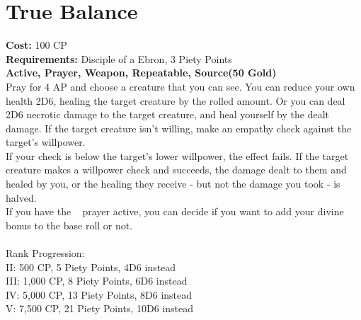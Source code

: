 \section{True Balance}\label{prayer:trueBalance}
\textbf{Cost:} 100 CP\\
\textbf{Requirements:} Disciple of a Ebron, 3 Piety Points \\
\textbf{Active, Prayer, Weapon, Repeatable, Source(50 Gold)}\\
Pray for 4 AP and choose a creature that you can see.
You can reduce your own health 2D6, healing the target creature by the rolled amount.
Or you can deal 2D6 necrotic damage to the target creature, and heal yourself by the dealt damage.
If the target creature isn't willing, make an empathy check against the target's willpower.\\
If your check is below the target's lower willpower, the effect fails.
If the target creature makes a willpower check and succeeds, the damage dealt to them and healed by you, or the healing they receive - but not the damage you took - is halved.\\
If you have the ~ prayer active, you can decide if you want to add your divine bonus to the base roll or not.\\
\\
Rank Progression:\\
II: 500 CP, 5 Piety Points, 4D6 instead\\
III: 1,000 CP, 8 Piety Points, 6D6 instead\\
IV: 5,000 CP, 13 Piety Points, 8D6 instead\\
V: 7,500 CP, 21 Piety Points, 10D6 instead\\